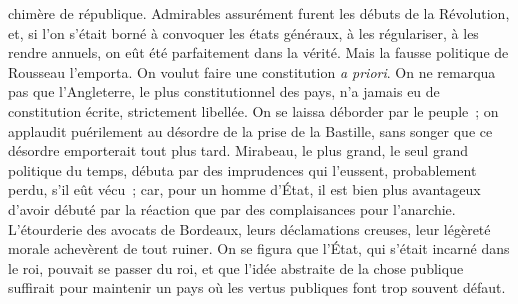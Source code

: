 \documentclass[french,twoside]{book} %
\begin{document}
chimère de république. Admirables assurément furent les débuts de la Révolution, et, si l’on s’était borné à convoquer les états généraux, à les régulariser, à les rendre annuels, on eût été parfaitement dans la vérité. Mais la fausse politique de Rousseau l’emporta. On voulut faire une constitution {\itshape a priori}. On ne remarqua pas que l’Angleterre, le plus constitutionnel des pays, n’a jamais eu de constitution écrite, strictement libellée. On se laissa déborder par le peuple ; on applaudit puérilement au désordre de la prise de la Bastille, sans songer que ce désordre emporterait tout plus tard. Mirabeau, le plus grand, le seul grand politique du temps, débuta par des imprudences qui l’eussent, probablement perdu, s’il eût vécu ; car, pour un homme d’État, il est bien plus avantageux d’avoir débuté par la réaction que par des complaisances pour l’anarchie. L’étourderie des avocats de Bordeaux, leurs déclamations creuses, leur légèreté morale achevèrent de tout ruiner. On se figura que l’État, qui s’était incarné dans le roi, pouvait se passer du roi, et que l’idée abstraite de la chose publique suffirait pour maintenir un pays où les vertus publiques font trop souvent défaut.\par
\end{document}
